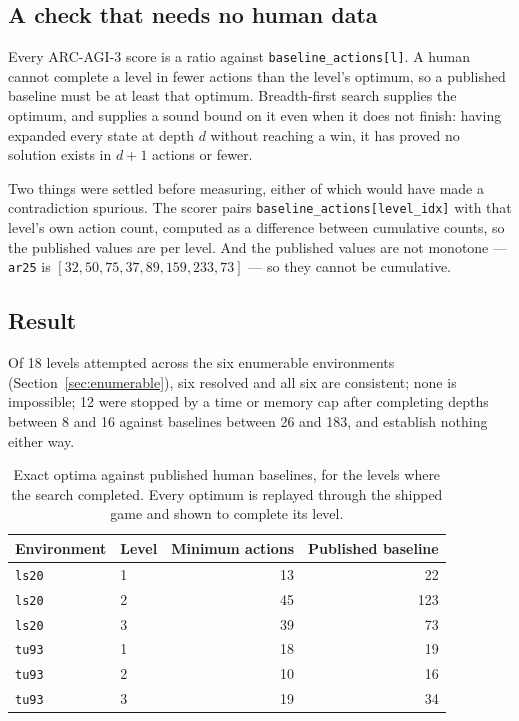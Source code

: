 \documentclass[11pt]{article}
\newcommand{\code}[1]{\texttt{#1}}
\begin{document}
\subsection{A check that needs no human data}

Every ARC-AGI-3 score is a ratio against \code{baseline\_actions[l]}. A human
cannot complete a level in fewer actions than the level's optimum, so a
published baseline must be at least that optimum. Breadth-first search supplies
the optimum, and supplies a sound bound on it even when it does not finish:
having expanded every state at depth $d$ without reaching a win, it has proved
no solution exists in $d+1$ actions or fewer.

Two things were settled before measuring, either of which would have made a
contradiction spurious. The scorer pairs \code{baseline\_actions[level\_idx]}
with that level's own action count, computed as a difference between cumulative
counts, so the published values are per level. And the published values are not
monotone --- \code{ar25} is $[32, 50, 75, 37, 89, 159, 233, 73]$ --- so they
cannot be cumulative.

\subsection{Result}

Of 18 levels attempted across the six enumerable environments (Section~\ref{sec:enumerable}), six resolved and
all six are consistent; none is impossible; 12 were stopped by a time or
memory cap after completing depths between 8 and 16 against baselines between 26
and 183, and establish nothing either way.

\begin{table}[t]
\centering
\begin{tabular}{llrr}
\toprule
Environment & Level & Minimum actions & Published baseline \\
\midrule
\code{ls20} & 1 & 13 & 22 \\
\code{ls20} & 2 & 45 & 123 \\
\code{ls20} & 3 & 39 & 73 \\
\code{tu93} & 1 & 18 & 19 \\
\code{tu93} & 2 & 10 & 16 \\
\code{tu93} & 3 & 19 & 34 \\
\bottomrule
\end{tabular}
\caption{Exact optima against published human baselines, for the levels where
the search completed. Every optimum is replayed through the shipped game and
shown to complete its level.}
\label{tab:baselines}
\end{table}
\end{document}
